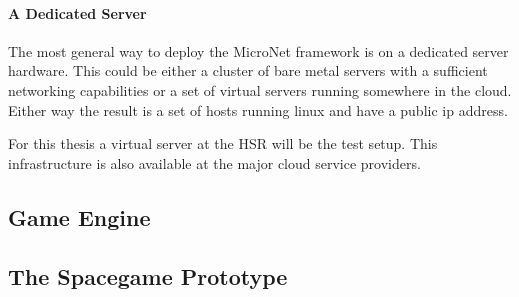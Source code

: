 \paragraph{A Dedicated Server}

The most general way to deploy the MicroNet framework is on a dedicated server
hardware. This could be either a cluster of bare metal servers with a sufficient
networking capabilities or a set of virtual servers running somewhere in the
cloud. Either way the result is a set of hosts running linux and have a public
ip address.

For this thesis a virtual server at the HSR will be the test setup. This
infrastructure is also available at the major cloud service providers.





\subsection{Game Engine}

\subsection{The Spacegame Prototype}

